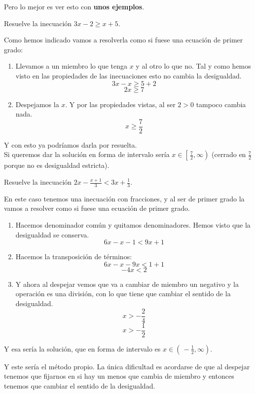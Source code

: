\documentclass[a4paper,11pt,answers]{exam}
\begin{document}
  Pero lo mejor es ver esto con \textbf{unos ejemplos}.
  \begin{questions}
  \question Resuelve la inecuación $3x - 2 \geq x + 5$.
    \begin{solution}
      Como hemos indicado vamos a resolverla como si fuese una ecuación de primer grado:
      \begin{enumerate}
      \item Llevamos a un miembro lo que tenga $x$ y al otro lo que no.
        Tal y como hemos visto en las
        propiedades de las inecuaciones esto no cambia la desigualdad.
        \[3x - x \geq 5 + 2\]
        \[2x \geq 7\]
      \item Despejamos la $x$. Y por las propiedades vistas, al ser $2>0$ tampoco cambia nada.
        \[x \geq \frac{7}{2}\]
      \end{enumerate}
      Y con esto ya podríamos darla por resuelta.\\
      Si queremos dar la solución en forma de intervalo sería $x \in \left[\,\frac{7}{2}, \infty\right)$ (cerrado en
      $\frac{7}{2}$ porque no es desigualdad estricta).
    \end{solution}
  \question Resuelve la inecuación $2x - \frac{x + 1}{3} < 3x + \frac{1}{3}$.
    \begin{solution}
      En este caso tenemos una inecuación con fracciones, y al ser de primer grado la vamos a resolver como
      si fuese una ecuación de primer grado.\\
      \begin{enumerate}
      \item Hacemos denominador común y quitamos denominadores. Hemos visto que la desigualdad se conserva.
        \[6x - x - 1 < 9x + 1\]
      \item Hacemos la transposición de términos:
        \[6x -x - 9x < 1+1\]
        \[-4x < 2\]
      \item Y ahora al despejar vemos que va a cambiar de miembro un negativo y la operación es una división,
        con lo que tiene que cambiar el sentido de la desigualdad.
        \[x > -\frac{2}{4}\]
        \[x > - \frac{1}{2}\]
      \end{enumerate}
      Y esa sería la solución, que en forma de intervalo es $x \in \left(\,-\frac{1}{2}, \infty\right)$.
    \end{solution}
  \end{questions}
  Y este sería el método propio. La única dificultad es acordarse de que al despejar tenemos que fijarnos en
  si hay un menos que cambia de miembro y entonces tenemos que cambiar el sentido de la desigualdad.
\end{document}
